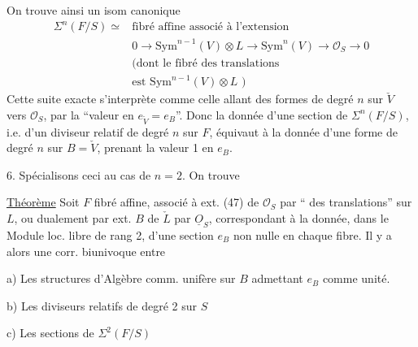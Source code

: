 On trouve ainsi un isom canonique
\[
\begin{aligned}
\Sigma^n(F/S)\simeq{}&\text{fibré affine associé à l'extension}\\
&0\longrightarrow\mathrm{Sym}^{n-1}(V)\otimes L\longrightarrow\mathrm{Sym}^n(V)\longrightarrow\mathcal O_S\longrightarrow0\\
&\text{(dont le fibré des translations}\\
&\text{est }\mathrm{Sym}^{n-1}(V)\otimes L\text{ )}
\end{aligned}\tag*{(62)}
\]
Cette suite exacte s'interprète comme celle
 allant des formes de degré $n$ sur $\check V$  vers $\mathcal O_S$,
par la ``valeur en $e_{\check V}=e_B$''. Donc la donnée
d'une section de $\Sigma^n(F/S)$, i.e. d'un
diviseur relatif de degré $n$ sur $F$, équivaut
à la donnée d'une forme de degré $n$ sur
$B=\check V$, prenant la valeur 1 en $e_B$.

6. Spécialisons ceci au cas de $n=2$. On trouve

\uline{Théorème} Soit $F$ fibré affine, associé à
ext. (47) de $\mathcal O_S$ par `` des translations'' sur $L$,
ou dualement par ext. $B$ de $\check L$ par $\underline O_S$, correspondant
à la donnée, dans le Module loc. libre
 de rang 2,  d'une section $e_B$ non nulle
en chaque fibre. Il y a alors une
corr. biunivoque entre

a) Les structures d'Algèbre comm. unifère
sur $B$ admettant $e_B$ comme  unité.

b) Les diviseurs relatifs  de degré 2 sur $S$

c) Les sections de $\Sigma^2(F/S)$
